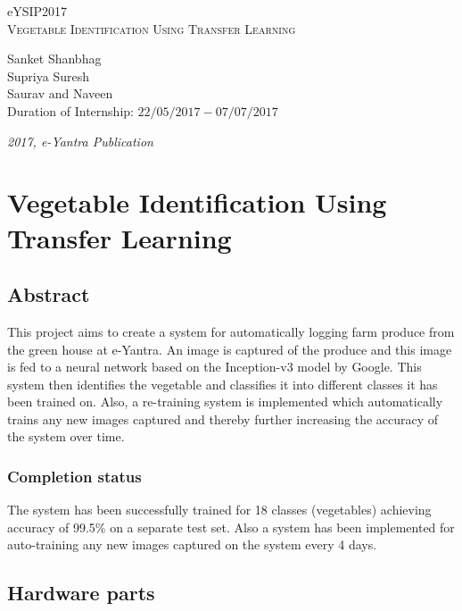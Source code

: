 \documentclass[a4paper,12pt,oneside]{book}
\begin{document}
\begin{titlepage}
\raggedright
{\Large eYSIP2017\\[1cm]}
{\Huge\scshape Vegetable Identification Using Transfer Learning \\[.1in]}
\vfill
\begin{flushright}
{\large Sanket Shanbhag \\}
{\large Supriya Suresh \\}
{\large Saurav and Naveen \\}
{\large Duration of Internship: $ 22/05/2017-07/07/2017 $ \\}
\end{flushright}

{\itshape 2017, e-Yantra Publication}
\end{titlepage}

\chapter[Project Tag]{Vegetable Identification Using \\ Transfer Learning}
\section*{Abstract}
This project aims to create a system for automatically logging farm produce from the green house at e-Yantra. An image is captured of the produce and this image is fed to a neural network based on the Inception-v3 model by Google. This system then identifies the vegetable and classifies it into different classes it has been trained on. Also, a re-training system is implemented which automatically trains any new images captured and thereby further increasing the accuracy of the system over time.

\subsection*{Completion status}
The system has been successfully trained for 18 classes (vegetables) achieving accuracy of 99.5\% on a separate test set. Also a system has been implemented for auto-training any new images captured on the system every 4 days.

\section{Hardware parts}
\end{document}
